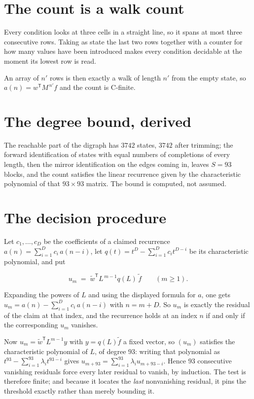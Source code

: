 \documentclass[11pt]{article}
\theoremstyle{definition}
\begin{document}
\section{The count is a walk count}

Every condition looks at three cells in a straight line, so it spans at most three consecutive rows. Taking as state the last two rows together with a counter for how many values have been introduced makes every condition decidable at the moment its lowest row is read.

An array of $n'$ rows is then exactly a walk of length $n'$ from the empty state, so $a(n) = w^{\mathsf T}M^{\,n'}f$ and the count is C-finite.

\section{The degree bound, derived}

The reachable part of the digraph has $3742$ states, $3742$ after trimming; the forward identification of states with equal numbers of completions of every length, then the mirror identification on the edges coming in, leaves $S = 93$ blocks, and the count satisfies the linear recurrence given by the characteristic polynomial of that $93\times93$ matrix. The bound is computed, not assumed.

\section{The decision procedure}

Let $c_1,\dots,c_D$ be the coefficients of a claimed recurrence $a(n) = \sum_{i=1}^{D} c_i\,a(n-i)$, let $q(t) = t^{D} - \sum_{i=1}^{D} c_i t^{D-i}$ be its characteristic polynomial, and put

\[u_m \;=\; \tilde w^{\mathsf T} L^{\,m-1} q(L)\,\tilde f \qquad (m \ge 1).\]

Expanding the powers of $L$ and using the displayed formula for $a$, one gets $u_m = a(n) - \sum_{i=1}^{D} c_i\,a(n-i)$ with $n = m + D$. So $u_m$ is exactly the residual of the claim at that index, and the recurrence holds at an index $n$ if and only if the corresponding $u_m$ vanishes.

Now $u_m = \tilde w^{\mathsf T} L^{m-1} y$ with $y = q(L)\tilde f$ a fixed vector, so $(u_m)$ satisfies the characteristic polynomial of $L$, of degree $93$: writing that polynomial as $t^{93} - \sum_{i=1}^{93} \lambda_i t^{93-i}$ gives $u_{m+93} = \sum_{i=1}^{93} \lambda_i u_{m+93-i}$. Hence $93$ consecutive vanishing residuals force every later residual to vanish, by induction. The test is therefore finite; and because it locates the {\itshape last} nonvanishing residual, it pins the threshold exactly rather than merely bounding it.
\end{document}
